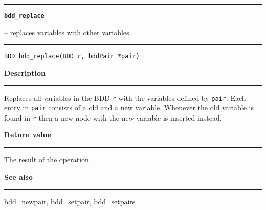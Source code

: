 \begin{minipage}{\textwidth}

\noindent\begin{minipage}{\textwidth}
\rule{\textwidth}{0.5mm}
{\tt\bf bdd\_replace }
\--- replaces variables with other variables  \hspace{\fill}
\\\rule[1.5ex]{\textwidth}{0.5mm}
\end{minipage}

\noindent\begin{verbatim}
BDD bdd_replace(BDD r, bddPair *pair) 
\end{verbatim}

\vspace{\parsep}\noindent
{\bf Description}\\\rule[1.5ex]{\textwidth}{0.2mm}\vspace{-1.5ex}\setlength{\parindent}{1em}
Replaces all variables in the BDD {\tt r} with the variables
           defined by {\tt pair}. Each entry in {\tt pair} consists of a
	   old and a new variable. Whenever the old variable is found in
	   {\tt r} then a new node with the new variable is inserted instead.
	

\setlength{\parindent}{0em}\vspace{\parsep}\vspace{\baselineskip}\noindent
{\bf Return value}\\\rule[1.5ex]{\textwidth}{0.2mm}\vspace{-1.5ex}
The result of the operation. 

\vspace{\parsep}\vspace{\baselineskip}\noindent
{\bf See also}\\\rule[1.5ex]{\textwidth}{0.2mm}\vspace{-1.5ex}
bdd\_newpair, bdd\_setpair, bdd\_setpairs 
\end{minipage}
\vspace{8ex}

